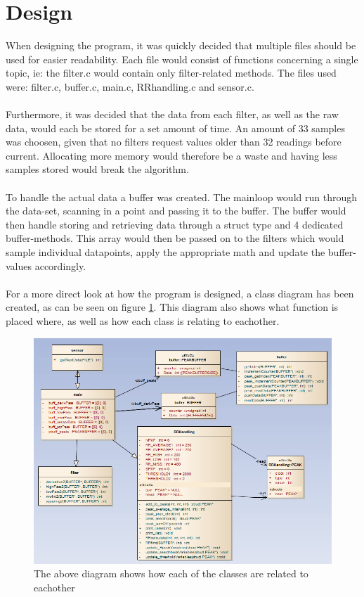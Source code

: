 \documentclass[12pt,a4paper]{article}
\begin{document}
\section{Design}
	When designing the program, it was quickly decided that multiple files should be used for easier readability. Each file would consist of functions concerning a single topic, ie: the filter.c would contain only filter-related methods. The files used were: filter.c, buffer.c, main.c, RRhandling.c and sensor.c.\\
	\\
	Furthermore, it was decided that the data from each filter, as well as the raw data, would each be stored for a set amount of time. An amount of 33 samples was choosen, given that no filters request values older than 32 readings before current. Allocating more memory would therefore be a waste and having less samples stored would break the algorithm.\\
	\\
	To handle the actual data a buffer was created. The mainloop would run through the data-set, scanning in a point and passing it to the buffer. The buffer would then handle storing and retrieving data through a struct type and 4 dedicated buffer-methods. This array would then be passed on to the filters which would sample individual datapoints, apply the appropriate math and update the buffer-values accordingly.\\
	\\
	For a more direct look at how the program is designed, a class diagram has been created, as can be seen on figure \ref{class_diagram}. This diagram also shows what function is placed where, as well as how each class is relating to eachother.
	\begin{figure}[h!]
		\centering
			\includegraphics[width=1\textwidth]{Screenshots/class_diagram.png}
		\caption{The above diagram shows how each of the classes are related to eachother}
		\label{class_diagram}
	\end{figure}
\end{document}
